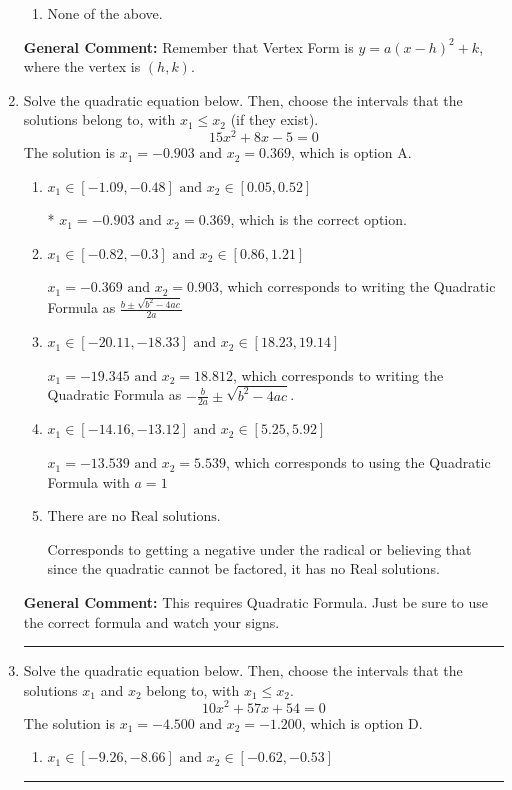 \documentclass{extbook}[14pt]
\newcommand{\litem}[1]{\item #1

\rule{\textwidth}{0.4pt}}
\begin{document}
\begin{enumerate}
{\begin{enumerate}[label=\Alph*.]
\item None of the above.\end{enumerate}
\textbf{General Comment:} Remember that Vertex Form is $y = a(x-h)^2+k$, where the vertex is $(h, k)$.
}
\litem{
Solve the quadratic equation below. Then, choose the intervals that the solutions belong to, with $x_1 \leq x_2$ (if they exist).
\[ 15x^{2} +8 x -5 = 0 \]The solution is \( x_1 = -0.903 \text{ and } x_2 = 0.369 \), which is option A.\begin{enumerate}[label=\Alph*.]
\item \( x_1 \in [-1.09, -0.48] \text{ and } x_2 \in [0.05, 0.52] \)

* $x_1 = -0.903 \text{ and } x_2 = 0.369$, which is the correct option.
\item \( x_1 \in [-0.82, -0.3] \text{ and } x_2 \in [0.86, 1.21] \)

 $x_1 = -0.369 \text{ and } x_2 = 0.903$, which corresponds to writing the Quadratic Formula as $\frac{b \pm \sqrt{b^2 - 4ac}}{2a}$
\item \( x_1 \in [-20.11, -18.33] \text{ and } x_2 \in [18.23, 19.14] \)

 $x_1 = -19.345 \text{ and } x_2 = 18.812$, which corresponds to writing the Quadratic Formula as $-\frac{b}{2a} \pm \sqrt{b^2 - 4ac}$.
\item \( x_1 \in [-14.16, -13.12] \text{ and } x_2 \in [5.25, 5.92] \)

 $x_1 = -13.539 \text{ and } x_2 = 5.539$, which corresponds to using the Quadratic Formula with $a=1$
\item \( \text{There are no Real solutions.} \)

Corresponds to getting a negative under the radical or believing that since the quadratic cannot be factored, it has no Real solutions.
\end{enumerate}

\textbf{General Comment:} This requires Quadratic Formula. Just be sure to use the correct formula and watch your signs.
}
\litem{
Solve the quadratic equation below. Then, choose the intervals that the solutions $x_1$ and $x_2$ belong to, with $x_1 \leq x_2$.
\[ 10x^{2} +57 x + 54 = 0 \]The solution is \( x_1 = -4.500 \text{ and } x_2 = -1.200 \), which is option D.\begin{enumerate}[label=\Alph*.]
\item \( x_1 \in [-9.26, -8.66] \text{ and } x_2 \in [-0.62, -0.53] \)


\end{enumerate}}
\end{enumerate}
\end{document}
